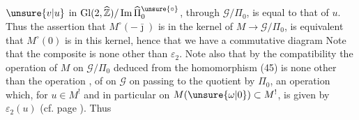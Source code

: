 $\unsure{v|u}$ in $\mathrm{Gl}(2,\widehat{\mathbb Z})/\operatorname{Im}\widehat{\Pi}_0^{\unsure{\circ}}$,  through $\mathcal G/\Pi_0$, is equal to that of $u$. Thus the assertion that $M^\circ(-\bar\jmath)$ is in the kernel of $M\longrightarrow\mathcal G/\Pi_0$, is equivalent  that $M^\circ(0)$ is in this kernel, hence that we have a commutative diagram
Note that the composite
is none other than $\varepsilon_2$. Note also that by the compatibility
the operation of $M$ on $\mathcal G/\Pi_0$ deduced from the homomorphism (45) is none other than the operation , of  on $\mathcal G$ on passing to the quotient by $\Pi_0$, an operation which, for $u\in M^!$ and in particular on $M(\unsure{\omega|0})\subset M^!$, is given by $\varepsilon_2(u)$ (cf. page ). Thus

